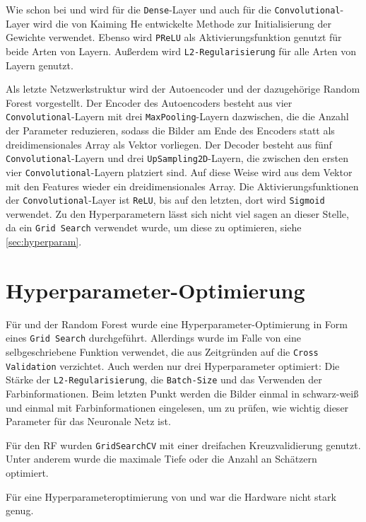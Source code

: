 Wie schon bei \PreDog und \PreBig wird für die \texttt{Dense}-Layer und auch
für die \texttt{Convolutional}-Layer wird die von Kaiming He entwickelte Methode
zur Initialisierung der Gewichte verwendet. Ebenso wird \texttt{PReLU} als
Aktivierungsfunktion genutzt für beide Arten von Layern. Außerdem wird
\texttt{L2-Regularisierung} für alle Arten von Layern genutzt.

Als letzte Netzwerkstruktur wird der Autoencoder und der dazugehörige Random
Forest vorgestellt. Der Encoder des Autoencoders besteht aus vier
\texttt{Convolutional}-Layern mit drei \texttt{MaxPooling}-Layern dazwischen,
die die Anzahl der Parameter reduzieren, sodass die Bilder am Ende des Encoders
statt als dreidimensionales Array als Vektor vorliegen. Der Decoder besteht aus
fünf \texttt{Convolutional}-Layern und drei \texttt{UpSampling2D}-Layern, die
zwischen den ersten vier \texttt{Convolutional}-Layern platziert sind. Auf diese
Weise wird aus dem Vektor mit den Features wieder ein dreidimensionales Array.
Die Aktivierungsfunktionen der \texttt{Convolutional}-Layer ist \texttt{ReLU},
bis auf den letzten, dort wird \texttt{Sigmoid} verwendet. Zu den
Hyperparametern lässt sich nicht viel sagen an dieser Stelle, da ein
\texttt{Grid Search} verwendet wurde, um diese zu optimieren, siehe
\autoref{sec:hyperparam}.

\section{Hyperparameter-Optimierung}
\label{sec:hyperparam}
Für \MiniDog und der Random Forest wurde eine Hyperparameter-Optimierung in Form
eines \texttt{Grid Search} durchgeführt. Allerdings wurde im Falle von \MiniDog
eine selbgeschriebene Funktion verwendet, die aus Zeitgründen auf die
\texttt{Cross Validation} verzichtet. Auch werden nur drei Hyperparameter
optimiert: Die Stärke der \texttt{L2-Re\-gu\-la\-ri\-sier\-ung}, die
\texttt{Batch-Size} und das Verwenden der Farbinformationen. Beim letzten Punkt
werden die Bilder einmal in schwarz-weiß und einmal mit Farbinformationen
eingelesen, um zu prüfen, wie wichtig dieser Parameter für das Neuronale Netz
ist.

Für den RF wurden \texttt{GridSearchCV} mit einer dreifachen Kreuzvalidierung genutzt.
Unter anderem wurde die maximale Tiefe oder die Anzahl an Schätzern optimiert.


Für eine Hyperparameteroptimierung von \PreBig und \PreDog war die Hardware nicht stark genug.
